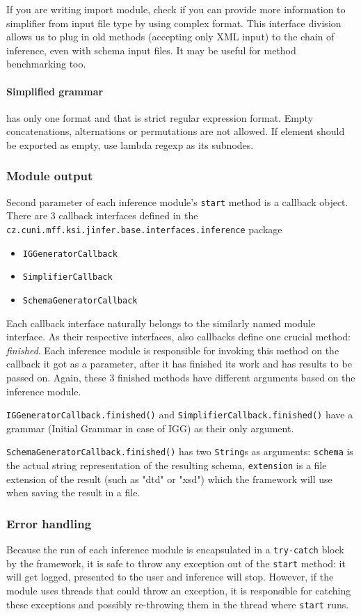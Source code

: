 \documentclass[a4paper,10pt,oneside]{article}
\newcommand{\code}[1]{\texttt{#1}}
\begin{document}
If you are writing import module, check if you can provide more information to simplifier from input file type by using complex format.
This interface division allows us to plug in old methods (accepting only XML input) to the chain of inference, even with schema input files.
It may be useful for method benchmarking too.

\paragraph{Simplified grammar} has only one format and that is strict regular expression format. Empty concatenations, alternations or permutations are not allowed. If element should be exported as empty, use lambda regexp as its subnodes.

\subsubsection{Module output}
Second parameter of each inference module's \code{start} method is a callback object. There are 3 callback interfaces defined in the \code{cz.cuni.mff.ksi.jinfer.base.interfaces.inference} package
\begin{itemize}
	\item \code{IGGeneratorCallback}
	\item \code{SimplifierCallback}
	\item \code{SchemaGeneratorCallback}
\end{itemize}
Each callback interface naturally belongs to the similarly named module interface. As their respective interfaces, also callbacks define one crucial method: \emph{finished}. Each inference module is responsible for invoking this method on the callback it got as a parameter, after it has finished its work and has results to be passed on. Again, these 3 finished methods have different arguments based on the inference module.

\code{IGGeneratorCallback.finished()} and \code{SimplifierCallback.finished()} have a grammar (Initial Grammar in case of IGG) as their only argument.

\code{SchemaGeneratorCallback.finished()} has two \code{String}s as arguments: \code{schema} is the actual string representation of the resulting schema, \code{extension} is a file extension of the result (such as "dtd" or "xsd") which the framework will use when saving the result in a file.

\subsubsection{Error handling}
Because the run of each inference module is encapsulated in a \code{try-catch} block by the framework, it is safe to throw any exception out of the \code{start} method: it will get logged, presented to the user and inference will stop. However, if the module uses threads that could throw an exception, it is responsible for catching these exceptions and possibly re-throwing them in the thread where \code{start} runs.
\end{document}
